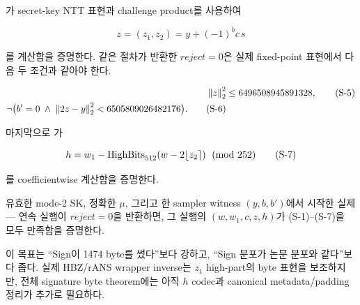 가 secret-key NTT 표현과 challenge product를 사용하여

\[
  z=(z_1,z_2)=y+(-1)^b c\,s
  \tag{S-4}
\]

를 계산함을 증명한다. 같은 절차가 반환한 \(reject=0\)은 실제 fixed-point
표현에서 다음 두 조건과 같아야 한다.

\begin{align}
\left\lVert z\right\rVert_2^2
  &\le 6496508945891328, \tag{S-5}\\
\neg\bigl(
  b'=0 \;\land\;
  \left\lVert 2z-y\right\rVert_2^2 < 6505809026482176
\bigr). \tag{S-6}
\end{align}

마지막으로 가

\[
  h=w_1-
  \operatorname{HighBits}_{512}\!\left(w-2\lfloor z_2\rceil\right)
  \pmod{252}
  \tag{S-7}
\]

를 coefficientwise 계산함을 증명한다.

\begin{verificationgoal}
유효한 mode-2 SK, 정확한 \(\mu\), 그리고 한 sampler witness
\((y,b,b')\)에서 시작한 실제
----
 연속 실행이 \(reject=0\)을 반환하면,
그 실행의 \((w,w_1,c,z,h)\)가
\textup{(S-1)}--\textup{(S-7)}을 모두 만족함을 증명한다.
\end{verificationgoal}

이 목표는 ``Sign이 1474 byte를 썼다''보다 강하고, ``Sign 분포가 논문 분포와
같다''보다 좁다. 실제 HBZ/rANS wrapper inverse는 \(z_1\) high-part의 byte
표현을 보조하지만, 전체 signature byte theorem에는 아직 \(h\) codec과
canonical metadata/padding 정리가 추가로 필요하다.
